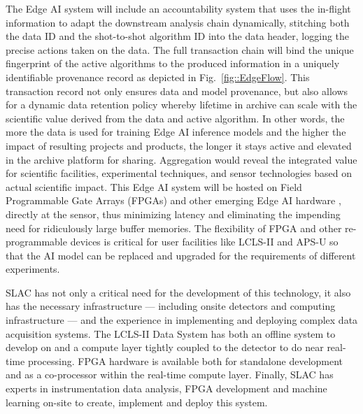 \documentclass{article}
\begin{document}
The Edge AI system will include an accountability system that uses the in-flight information to adapt the downstream analysis chain dynamically, stitching both the data ID and the shot-to-shot algorithm ID into the data header, logging the precise actions taken on the data.
The full transaction chain will bind the unique fingerprint of the active algorithms to the produced information in a uniquely identifiable provenance record as depicted in Fig.~\ref{fig::EdgeFlow}.
This transaction record not only ensures data and model provenance, but also allows for a dynamic data retention policy whereby lifetime in archive can scale with the scientific value derived from the data and active algorithm.
In other words, the more the data is used for training Edge AI inference models and the higher the impact of resulting projects and products, the longer it stays active and elevated in the archive platform for sharing. %
Aggregation would reveal the integrated value for scientific facilities, experimental techniques, and sensor technologies based on actual scientific impact.
This Edge AI system will be hosted on Field Programmable Gate Arrays (FPGAs) and other emerging Edge AI hardware \cite{edgetpu_benchmarks,edgetpu,waveCGRA,CGRAreview,seaofcores}, directly at the sensor, thus minimizing latency and eliminating the impending need for ridiculously large buffer memories.
The flexibility of FPGA and other re-programmable devices is critical for user facilities like LCLS-II and APS-U so that the AI model can be replaced and upgraded for the requirements of different experiments. 

SLAC has not only a critical need for the development of this technology, it also has the necessary infrastructure ---  including onsite detectors and computing infrastructure --- and the experience in implementing and deploying complex data acquisition systems. 
The LCLS-II Data System has both an offline system to develop on and a compute layer tightly coupled to the detector to do near real-time processing.
FPGA hardware is available both for standalone development and as a co-processor within the real-time compute layer. 
Finally, SLAC has experts in instrumentation data analysis, FPGA development and machine learning on-site to create, implement and deploy this system.
\end{document}
